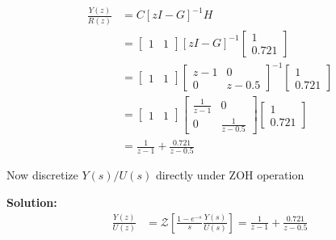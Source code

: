\documentclass[twoside]{article}
\begin{document}
\begin{align*}
 \frac{Y(z)}{R(z)} &= C \left[ z I - G \right]^{-1} H
\\
&= \left[ \begin{array}{cc} 1 & 1 \end{array} \right] 
\left[ z I - G \right]^{-1}
\left[ \begin{array}{c} 1 \\ 0.721 \end{array} \right]
\\
&= \left[ \begin{array}{cc} 1 & 1 \end{array} \right] 
\left[ 
\begin{array}{cc} 
             z-1 & 0 \\ 0 & z-0.5
\end{array} 
\right]^{-1}
\left[ \begin{array}{c} 1 \\ 0.721 \end{array} \right]
\\
&= \left[ \begin{array}{cc} 1 & 1 \end{array} \right] 
\left[ 
\begin{array}{cc} 
            \frac{1}{z-1} & 0 \\ 0 & \frac{1}{z-0.5}
\end{array} 
\right]
\left[ \begin{array}{c} 1 \\ 0.721 \end{array} \right]
\\
&= \frac{1}{z-1} + \frac{0.721}{z-0.5}
\end{align*}

Now discretize $Y(s)/U(s)$ directly under ZOH operation
%

\textbf{Solution:}
%
\begin{align*}
 \frac{Y(z)}{U(z)} &= \mathcal{Z} \left[ \frac{1 - e^{-s}}{s}
                     \frac{Y(s)}{U(s)} \right] = \frac{1}{z-1} + \frac{0.721}{z-0.5}
\end{align*}


\end{document}
